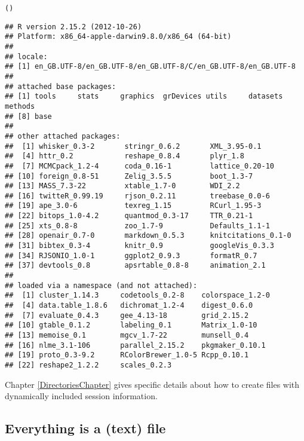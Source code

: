 {\footnotesize{
\begin{knitrout}
\color{fgcolor}\begin{kframe}
\begin{alltt}
()
\end{alltt}
\begin{verbatim}
## R version 2.15.2 (2012-10-26)
## Platform: x86_64-apple-darwin9.8.0/x86_64 (64-bit)
## 
## locale:
## [1] en_GB.UTF-8/en_GB.UTF-8/en_GB.UTF-8/C/en_GB.UTF-8/en_GB.UTF-8
## 
## attached base packages:
## [1] tools     stats     graphics  grDevices utils     datasets  methods  
## [8] base     
## 
## other attached packages:
##  [1] whisker_0.3-2       stringr_0.6.2       XML_3.95-0.1       
##  [4] httr_0.2            reshape_0.8.4       plyr_1.8           
##  [7] MCMCpack_1.2-4      coda_0.16-1         lattice_0.20-10    
## [10] foreign_0.8-51      Zelig_3.5.5         boot_1.3-7         
## [13] MASS_7.3-22         xtable_1.7-0        WDI_2.2            
## [16] twitteR_0.99.19     rjson_0.2.11        treebase_0.0-6     
## [19] ape_3.0-6           texreg_1.15         RCurl_1.95-3       
## [22] bitops_1.0-4.2      quantmod_0.3-17     TTR_0.21-1         
## [25] xts_0.8-8           zoo_1.7-9           Defaults_1.1-1     
## [28] openair_0.7-0       markdown_0.5.3      knitcitations_0.1-0
## [31] bibtex_0.3-4        knitr_0.9           googleVis_0.3.3    
## [34] RJSONIO_1.0-1       ggplot2_0.9.3       formatR_0.7        
## [37] devtools_0.8        apsrtable_0.8-8     animation_2.1      
## 
## loaded via a namespace (and not attached):
##  [1] cluster_1.14.3     codetools_0.2-8    colorspace_1.2-0  
##  [4] data.table_1.8.6   dichromat_1.2-4    digest_0.6.0      
##  [7] evaluate_0.4.3     gee_4.13-18        grid_2.15.2       
## [10] gtable_0.1.2       labeling_0.1       Matrix_1.0-10     
## [13] memoise_0.1        mgcv_1.7-22        munsell_0.4       
## [16] nlme_3.1-106       parallel_2.15.2    pkgmaker_0.10.1   
## [19] proto_0.3-9.2      RColorBrewer_1.0-5 Rcpp_0.10.1       
## [22] reshape2_1.2.2     scales_0.2.3
\end{verbatim}
\end{kframe}
\end{knitrout}

}}
\noindent Chapter \ref{DirectoriesChapter} gives specific details about how to create files with dynamically included session information.

\subsection{Everything is a (text) file}

